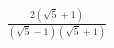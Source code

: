 \documentclass[preview]{standalone}
\begin{document}
\begin{align*}
{\frac{2(\sqrt{5} + 1 )}{(\sqrt{5} - 1)(\sqrt{5} + 1)}}
\end{align*}
\end{document}
